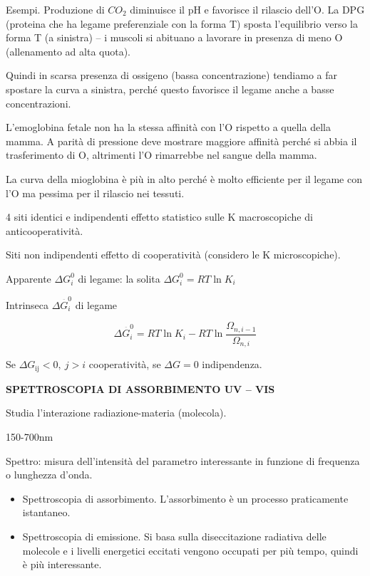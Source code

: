 Esempi. Produzione di \(CO_{2}\) diminuisce il pH e favorisce il
rilascio dell'O. La DPG (proteina che ha legame preferenziale con la
forma T) sposta l'equilibrio verso la forma T (a sinistra) -- i muscoli
si abituano a lavorare in presenza di meno O (allenamento ad alta
quota).

Quindi in scarsa presenza di ossigeno (bassa concentrazione) tendiamo a
far spostare la curva a sinistra, perché questo favorisce il legame
anche a basse concentrazioni.

L'emoglobina fetale non ha la stessa affinità con l'O rispetto a quella
della mamma. A parità di pressione deve mostrare maggiore affinità
perché si abbia il trasferimento di O, altrimenti l'O rimarrebbe nel
sangue della mamma.

La curva della mioglobina è più in alto perché è molto efficiente per il
legame con l'O ma pessima per il rilascio nei tessuti.

4 siti identici e indipendenti effetto statistico sulle K macroscopiche
di anticooperatività.

Siti non indipendenti effetto di cooperatività (considero le K
microscopiche).

Apparente \(\Delta G_{i}^{0}\) di legame: la solita
\(\Delta G_{i}^{0} = RT\ln K_{i}\)

Intrinseca \(\Delta{\overset{\overline{}}{G}}_{i}^{0}\) di legame

\[\Delta{\overset{\overline{}}{G}}_{i}^{0} = RT\ln K_{i} - RT\ln\frac{\Omega_{n,i - 1}}{\Omega_{n,i}}\]

Se \(\Delta G_{\text{ij}} < 0,\ j > i\) cooperatività, se
\(\Delta G = 0\) indipendenza.

\textbf{SPETTROSCOPIA DI ASSORBIMENTO UV -- VIS}

Studia l'interazione radiazione-materia (molecola).

150-700nm

Spettro: misura dell'intensità del parametro interessante in funzione di
frequenza o lunghezza d'onda.

\begin{itemize}
\item
  Spettroscopia di assorbimento. L'assorbimento è un processo
  praticamente istantaneo.
\item
  Spettroscopia di emissione. Si basa sulla diseccitazione radiativa
  delle molecole e i livelli energetici eccitati vengono occupati per
  più tempo, quindi è più interessante.
\end{itemize}

